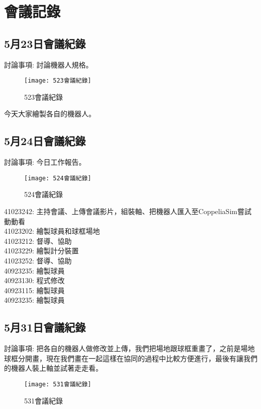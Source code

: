 \chapter{會議記錄}
\section{5月23日會議紀錄}
討論事項: 討論機器人規格。\\[6pt]
\begin{figure}[hbt!]
\begin{center}
\label{523會議紀錄}
\texttt{[image: 523會議紀錄]}
\caption{\Large 523會議紀錄}
\end{center}
\end{figure}
今天大家繪製各自的機器人。\\

\section{5月24日會議紀錄}
討論事項: 今日工作報告。\\
\begin{figure}[hbt!]
\begin{center}
\label{524會議紀錄}
\texttt{[image: 524會議紀錄]}
\caption{\Large 524會議紀錄}
\end{center}
\end{figure}
41023242: 主持會議、上傳會議影片，組裝軸、把機器人匯入至CoppeliaSim嘗試動動看\\

41023202: 繪製球員和球框場地\\

41023212: 督導、協助\\

41023229: 繪製計分裝置\\

41023252: 督導、協助\\

40923235: 繪製球員\\

40923130: 程式修改\\ 

40923115: 繪製球員\\ 

40923235: 繪製球員\\ 

\section{5月31日會議紀錄}
討論事項: 把各自的機器人做修改並上傳，我們把場地跟球框重畫了，之前是場地球框分開畫，現在我們畫在一起這樣在協同的過程中比較方便進行，最後有讓我們的機器人裝上軸並試著走走看。\\
\begin{figure}[hbt!]
\begin{center}
\label{531會議紀錄}
\texttt{[image: 531會議紀錄]}
\caption{\Large 531會議紀錄}
\end{center}
\end{figure}

\newpage
